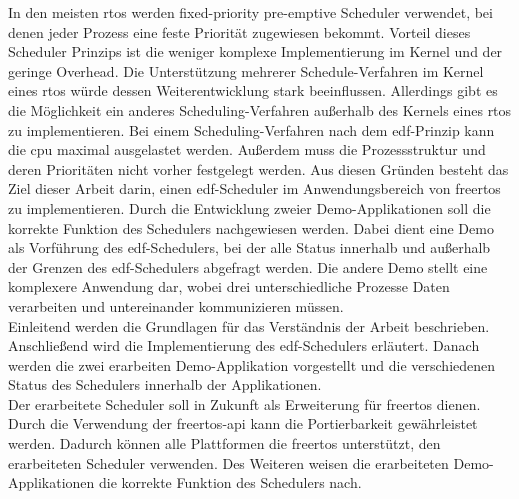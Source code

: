 \documentclass[../EDF Master Thesis.tex]{subfiles}
\begin{document}
    In den meisten \ac{rtos} werden fixed-priority pre-emptive Scheduler verwendet, bei denen jeder Prozess eine feste Priorität zugewiesen bekommt.
    Vorteil dieses Scheduler Prinzips ist die weniger komplexe Implementierung im Kernel und der geringe Overhead.
    Die Unterstützung mehrerer Schedule-Verfahren im Kernel eines \ac{rtos} würde dessen Weiterentwicklung stark beeinflussen.
    Allerdings gibt es die Möglichkeit ein anderes Scheduling-Verfahren außerhalb des Kernels eines \ac{rtos} zu implementieren.
    Bei einem Scheduling-Verfahren nach dem \ac{edf}-Prinzip kann die \ac{cpu} maximal ausgelastet werden.
    Außerdem muss die Prozessstruktur und deren Prioritäten nicht vorher festgelegt werden.
    Aus diesen Gründen besteht das Ziel dieser Arbeit darin, einen \ac{edf}-Scheduler im Anwendungsbereich von \ac{freertos} zu implementieren.
    Durch die Entwicklung zweier Demo-Applikationen soll die korrekte Funktion des Schedulers nachgewiesen werden.
    Dabei dient eine Demo als Vorführung des \ac{edf}-Schedulers, bei der alle Status innerhalb und außerhalb der Grenzen des \ac{edf}-Schedulers abgefragt werden.
    Die andere Demo stellt eine komplexere Anwendung dar, wobei drei unterschiedliche Prozesse Daten verarbeiten und untereinander kommunizieren müssen.\\
    Einleitend werden die Grundlagen für das Verständnis der Arbeit beschrieben.
    Anschließend wird die Implementierung des \ac{edf}-Schedulers erläutert.
    Danach werden die zwei erarbeiten Demo-Applikation vorgestellt und die verschiedenen Status des Schedulers innerhalb der Applikationen.\\
    Der erarbeitete Scheduler soll in Zukunft als Erweiterung für \ac{freertos} dienen.
    Durch die Verwendung der \ac{freertos}-\ac{api} kann die Portierbarkeit gewährleistet werden.
    Dadurch können alle Plattformen die \ac{freertos} unterstützt, den erarbeiteten Scheduler verwenden.
    Des Weiteren weisen die erarbeiteten Demo-Applikationen die korrekte Funktion des Schedulers nach.
\end{document}
